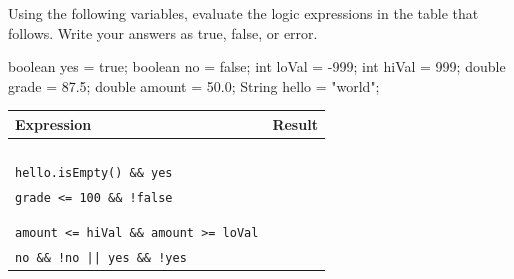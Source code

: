 \begin{exercise}  %

Using the following variables, evaluate the logic expressions in the table that follows.
Write your answers as true, false, or error.

\begin{code}
boolean yes = true;
boolean no = false;
int loVal = -999;
int hiVal = 999;
double grade = 87.5;
double amount = 50.0;
String hello = "world";
\end{code}

\vspace{1ex}

\begin{center}
\begin{tabular}{|l|l|}
\hline
Expression & Result \\
\hline
\hline
{} & \hspace{5em} \\
\hline
{} &  \\
\hline
{} &  \\
\hline
{} &  \\
\hline
\lstinline|hello.isEmpty() && yes| &  \\
\hline
\lstinline|grade <= 100 && !false| &  \\
\hline
{} &  \\
\hline
{} &  \\
\hline
\lstinline|amount <= hiVal && amount >= loVal| &  \\
\hline
\lstinline+no && !no || yes && !yes+ &  \\
\hline
\end{tabular}
\end{center}

\end{exercise}


